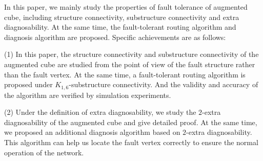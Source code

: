 \begin{englishabstract}
In this paper, we mainly study the properties of fault tolerance of augmented cube, including structure connectivity, substructure connectivity and extra diagnosability. At the same time, the fault-tolerant routing algorithm and diagnosis algorithm are proposed. Specific achievements are as follows:

(1) In this paper, the structure connectivity and substructure connectivity of the augmented cube are studied from the point of view of the fault structure rather than the fault vertex. At the same time, a fault-tolerant routing algorithm is proposed under $K_{1,6}$-substructure connectivity. And the validity and accuracy of the algorithm are verified by simulation experiments.

(2) Under the definition of extra diagnosability, we study the  $2$-extra diagnosability of the augmented cube and give detailed proof. At the same time, we proposed an additional diagnosis algorithm based on $2$-extra diagnosability. This algorithm can help us locate the fault vertex correctly to ensure the normal operation of the network.






\end{englishabstract}




